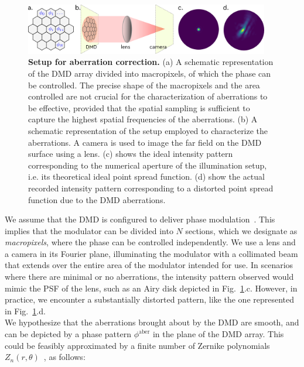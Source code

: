 \documentclass[12pt]{iopart}
\begin{document}
\begin{figure}
  \centering
  \includegraphics[width = 0.95\textwidth]{images/DMD_abberations_setup.pdf}
  \caption{
    \textbf{Setup for aberration correction.}
    (a) A schematic representation of the DMD array divided into macropixels,
    of which the phase can be controlled.
    The precise shape of the macropixels and the area controlled are not crucial for the characterization of aberrations to be effective,
    provided that the spatial sampling is sufficient to capture the highest spatial frequencies of the aberrations.
    (b) A schematic representation of the setup employed to characterize the aberrations.
    A camera is used to image the far field on the DMD surface using a lens.
    (c) shows the ideal intensity pattern corresponding to the numerical aperture of the illumination setup,
    i.e. its theoretical ideal point spread function.
    (d) show the actual recorded intensity pattern corresponding to a distorted point spread function due to the DMD aberrations.
  }
  \label{fig:dmd_aberr_setup}
\end{figure}


We assume that the DMD is configured to deliver phase modulation~\cite{lee1979binary,Gutierrez2024DMD}.
This implies that the modulator can be divided into $N$ sections,
which we designate as {\em macropixels},
where the phase can be controlled independently.
We use a lens and a camera in its Fourier plane,
illuminating the modulator with a collimated beam
that extends over the entire area of the modulator intended for use.
In scenarios where there are minimal or no aberrations,
the intensity pattern observed would mimic the PSF of the lens,
such as an Airy disk depicted in Fig.~\ref{fig:dmd_aberr_setup}.c.
However, in practice, we encounter a substantially distorted pattern,
like the one represented in Fig.~\ref{fig:dmd_aberr_setup}.d.\\

We hypothesize that the aberrations brought about by the DMD are smooth,
and can be depicted by a phase pattern $\phi^\text{aber}$ in the plane of the DMD array.
This could be feasibly approximated by a finite number of Zernike polynomials
$Z_n(r,\theta)$~\cite{Zernike1934beugungstheorie}, as follows:
\end{document}
